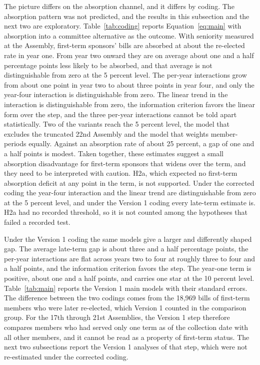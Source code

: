 \documentclass[11pt]{article}
\begin{document}
The picture differs on the absorption channel, and it differs by coding. The absorption pattern was not predicted, and the results in this subsection and the next two are exploratory. Table~\ref{tab:coding} reports Equation~\ref{eq:main} with absorption into a committee alternative as the outcome. With seniority measured at the Assembly, first-term sponsors' bills are absorbed at about the re-elected rate in year one. From year two onward they are on average about one and a half percentage points less likely to be absorbed, and that average is not distinguishable from zero at the 5 percent level. The per-year interactions grow from about one point in year two to about three points in year four, and only the year-four interaction is distinguishable from zero. The linear trend in the interaction is distinguishable from zero, the information criterion favors the linear form over the step, and the three per-year interactions cannot be told apart statistically. Two of the variants reach the 5 percent level, the model that excludes the truncated 22nd Assembly and the model that weights member-periods equally. Against an absorption rate of about 25 percent, a gap of one and a half points is modest. Taken together, these estimates suggest a small absorption disadvantage for first-term sponsors that widens over the term, and they need to be interpreted with caution. H2a, which expected no first-term absorption deficit at any point in the term, is not supported. Under the corrected coding the year-four interaction and the linear trend are distinguishable from zero at the 5 percent level, and under the Version 1 coding every late-term estimate is. H2a had no recorded threshold, so it is not counted among the hypotheses that failed a recorded test.

Under the Version 1 coding the same models give a larger and differently shaped gap. The average late-term gap is about three and a half percentage points, the per-year interactions are flat across years two to four at roughly three to four and a half points, and the information criterion favors the step. The year-one term is positive, about one and a half points, and carries one star at the 10 percent level. Table~\ref{tab:main} reports the Version 1 main models with their standard errors. The difference between the two codings comes from the 18,969 bills of first-term members who were later re-elected, which Version 1 counted in the comparison group. For the 17th through 21st Assemblies, the Version 1 step therefore compares members who had served only one term as of the collection date with all other members, and it cannot be read as a property of first-term status. The next two subsections report the Version 1 analyses of that step, which were not re-estimated under the corrected coding.
\end{document}
